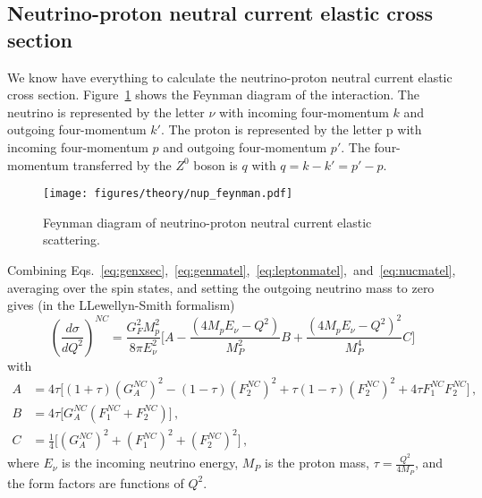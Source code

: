 \subsection{Neutrino-proton neutral current elastic cross section}\label{sec:probe}

  We know have everything to calculate the neutrino-proton neutral current
  elastic cross section. Figure~\ref{fig:feynmannup} shows the Feynman diagram
  of the interaction. The neutrino is represented by the letter $\nu$ with
  incoming four-momentum $k$ and outgoing four-momentum $k'$. The proton is
  represented by the letter p with incoming four-momentum $p$ and outgoing
  four-momentum $p'$. The four-momentum transferred by the $Z^0$ boson is $q$
  with $q = k-k' = p' - p$.
  \begin{figure}[ht]
    \centering
    \texttt{[image: figures/theory/nup\_feynman.pdf]}
    \caption{Feynman diagram of neutrino-proton neutral current elastic
    scattering.}
    \label{fig:feynmannup}
  \end{figure}

  Combining
  Eqs.~\ref{eq:genxsec},~\ref{eq:genmatel},~\ref{eq:leptonmatel},~and~\ref{eq:nucmatel},
  averaging over the spin states, and setting the outgoing neutrino mass to
  zero gives (in the LLewellyn-Smith formalism)~\cite{LLewellynSmith:1971uhs}
  \begin{equation}
    (\frac{d\sigma}{dQ^2})^{NC} = \frac{G_F^2 M_p^2}{8\pi E_{\nu}^2} 
      \bigg[A - \frac{(4M_p E_{\nu} - Q^2)}{M_P^2} B + \frac{(4M_p E_{\nu} - Q^2)^2}{M_P^4} C \bigg]
  \end{equation}
  with
  \begin{align}
    A &= 4\tau\big[(1+\tau)(G_A^{NC})^2 - (1-\tau)(F_2^{NC})^2 + \tau(1 - \tau)(F_2^{NC})^2 + 4\tau F_1^{NC} F_2^{NC}\big] \,, \\
    B &= 4\tau \big[G_A^{NC}(F_1^{NC} + F_2^{NC}) \big] \,, \\
    C &= \frac{1}{4}\big[ (G_A^{NC})^2 + (F_1^{NC})^2 + (F_2^{NC})^2 \big] \,,
  \end{align}
  where $E_{\nu}$ is the incoming neutrino energy, $M_P$ is the proton mass,
  $\tau = \frac{Q^2}{4M_P}$, and the form factors are functions of $Q^2$.


